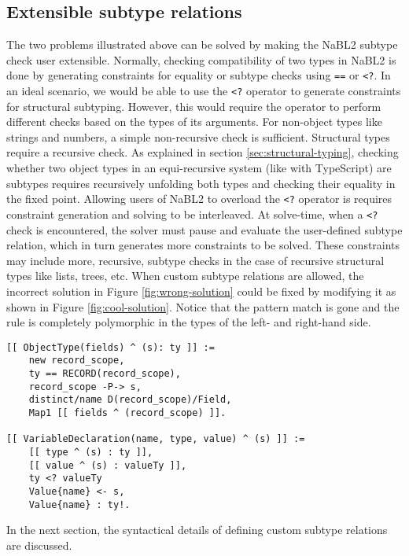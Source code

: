 \subsection{Extensible subtype relations}
The two problems illustrated above can be solved by making the NaBL2 subtype check user extensible.
Normally, checking compatibility of two types in NaBL2 is done by generating constraints for equality or subtype checks using \texttt{==} or \texttt{<?}.
In an ideal scenario, we would be able to use the \texttt{<?} operator to generate constraints for structural subtyping.
However, this would require the operator to perform different checks based on the types of its arguments.
For non-object types like strings and numbers, a simple non-recursive check is sufficient.
Structural types require a recursive check. 
As explained in section \ref{sec:structural-typing}, checking whether two object types in an equi-recursive system 
(like with TypeScript) are subtypes requires recursively unfolding both types and checking their equality in the fixed point.
Allowing users of NaBL2 to overload the \texttt{<?} operator is requires constraint generation and solving to be interleaved.
At solve-time, when a \texttt{<?} check is encountered, the solver must pause and evaluate the user-defined subtype relation, 
which in turn generates more constraints to be solved.
These constraints may include more, recursive, subtype checks in the case of recursive structural types like lists, trees, etc.
When custom subtype relations are allowed, 
the incorrect solution in Figure \ref{fig:wrong-solution} could be fixed by modifying it as shown in Figure \ref{fig:cool-solution}.
Notice that the pattern match is gone and the rule is completely polymorphic in the types of the left- and right-hand side.
\begin{figure*}
\begin{lstlisting}
[[ ObjectType(fields) ^ (s): ty ]] :=
    new record_scope,
    ty == RECORD(record_scope),
    record_scope -P-> s,
    distinct/name D(record_scope)/Field,
    Map1 [[ fields ^ (record_scope) ]].

[[ VariableDeclaration(name, type, value) ^ (s) ]] :=
    [[ type ^ (s) : ty ]],
    [[ value ^ (s) : valueTy ]],
    ty <? valueTy
    Value{name} <- s,
    Value{name} : ty!.
\end{lstlisting}
\caption{General solution when given the possibility of user-defined subtype checks.}
\label{fig:cool-solution}
\end{figure*}
In the next section, the syntactical details of defining custom subtype relations are discussed.

